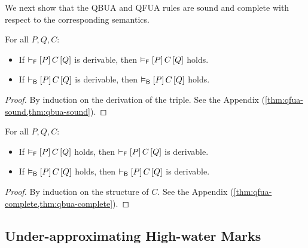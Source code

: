 We next show that the QBUA and QFUA rules are sound and complete with respect to the corresponding semantics.

\begin{theorem}\label{thm:QUA-soundness}
  For all $P,Q,C$:
  \begin{itemize}
    \item If $\vdash_{\mathsf{F}}\left[P\right]C\left[Q\right]$ is derivable, then $\vDash_{\mathsf{F}}\left[P\right]C\left[Q\right]$ holds.
    \item If $\vdash_{\mathsf{B}}\left[P\right]C\left[Q\right]$ is derivable, then $\vDash_{\mathsf{B}}\left[P\right]C\left[Q\right]$ holds.
  \end{itemize}
\end{theorem}
\begin{proof}
  By induction on the derivation of the triple. See the Appendix (\cref{thm:qfua-sound,thm:qbua-sound}).
\end{proof}

\begin{theorem}\label{thm:QUA-completeness}
  For all $P,Q,C$:
  \begin{itemize}
    \item If $\vDash_{\mathsf{F}}\left[P\right]C\left[Q\right]$ holds, then $\vdash_{\mathsf{F}}\left[P\right]C\left[Q\right]$ is derivable.
    \item If $\vDash_{\mathsf{B}}\left[P\right]C\left[Q\right]$ holds, then $\vdash_{\mathsf{B}}\left[P\right]C\left[Q\right]$ is derivable.
  \end{itemize}
\end{theorem}
\begin{proof}
  By induction on the structure of $C$. See the Appendix (\cref{thm:qfua-complete,thm:qbua-complete}).
\end{proof}

\subsection{Under-approximating High-water Marks}
\label{sec:technical:hwm}

